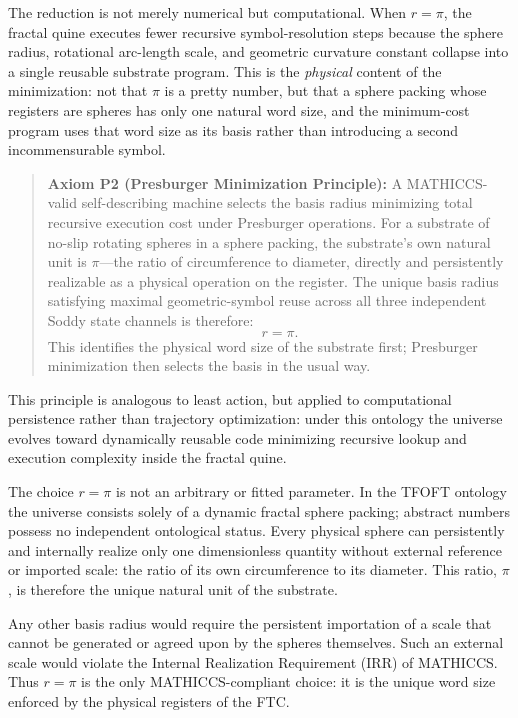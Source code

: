 \documentclass[11pt,a4paper]{article}
\begin{document}
The reduction is not merely numerical but computational. When $r = \pi$, the fractal quine executes fewer recursive symbol-resolution steps because the sphere radius, rotational arc-length scale, and geometric curvature constant collapse into a single reusable substrate program. This is the \emph{physical} content of the minimization: not that $\pi$ is a pretty number, but that a sphere packing whose registers are spheres has only one natural word size, and the minimum-cost program uses that word size as its basis rather than introducing a second incommensurable symbol.

\begin{quote}
\textbf{Axiom P2 (Presburger Minimization Principle):}
A MATHICCS-valid self-describing machine selects the basis radius minimizing total recursive execution cost under Presburger operations. For a substrate of no-slip rotating spheres in a sphere packing, the substrate's own natural unit is $\pi$---the ratio of circumference to diameter, directly and persistently realizable as a physical operation on the register. The unique basis radius satisfying maximal geometric-symbol reuse across all three independent Soddy state channels is therefore:
\[
\boxed{r = \pi}.
\]
This identifies the physical word size of the substrate first; Presburger minimization then selects the basis in the usual way.
\end{quote}

This principle is analogous to least action, but applied to computational persistence rather than trajectory optimization: under this ontology the universe evolves toward dynamically reusable code minimizing recursive lookup and execution complexity inside the fractal quine.

The choice \( r = \pi \) is not an arbitrary or fitted parameter. In the TFOFT ontology the universe consists solely of a dynamic fractal sphere packing; abstract numbers possess no independent ontological status. Every physical sphere can persistently and internally realize only one dimensionless quantity without external reference or imported scale: the ratio of its own circumference to its diameter. This ratio, \(\pi\), is therefore the unique natural unit of the substrate. 

Any other basis radius would require the persistent importation of a scale that cannot be generated or agreed upon by the spheres themselves. Such an external scale would violate the Internal Realization Requirement (IRR) of MATHICCS. Thus \( r = \pi \) is the only MATHICCS-compliant choice: it is the unique word size enforced by the physical registers of the FTC.
\end{document}
